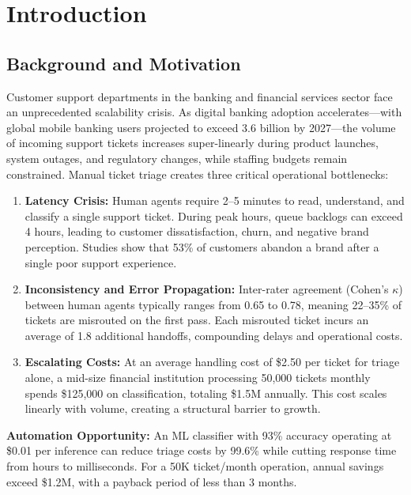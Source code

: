 \documentclass[12pt,a4paper]{article}
\begin{document}
\newpage

\section{Introduction}
\label{sec:introduction}

\subsection{Background and Motivation}
\label{subsec:background}

Customer support departments in the banking and financial services sector face an unprecedented scalability crisis. As digital banking adoption accelerates---with global mobile banking users projected to exceed 3.6 billion by 2027---the volume of incoming support tickets increases super-linearly during product launches, system outages, and regulatory changes, while staffing budgets remain constrained. Manual ticket triage creates three critical operational bottlenecks:

\begin{enumerate}[leftmargin=*]
    \item \textbf{Latency Crisis:} Human agents require 2--5 minutes to read, understand, and classify a single support ticket. During peak hours, queue backlogs can exceed 4 hours, leading to customer dissatisfaction, churn, and negative brand perception. Studies show that 53\% of customers abandon a brand after a single poor support experience.

    \item \textbf{Inconsistency and Error Propagation:} Inter-rater agreement (Cohen's $\kappa$) between human agents typically ranges from 0.65 to 0.78, meaning 22--35\% of tickets are misrouted on the first pass. Each misrouted ticket incurs an average of 1.8 additional handoffs, compounding delays and operational costs.

    \item \textbf{Escalating Costs:} At an average handling cost of \$2.50 per ticket for triage alone, a mid-size financial institution processing 50,000 tickets monthly spends \$125,000 on classification, totaling \$1.5M annually. This cost scales linearly with volume, creating a structural barrier to growth.
\end{enumerate}

\begin{insightbox}
\textbf{Automation Opportunity:} An ML classifier with 93\% accuracy operating at \$0.01 per inference can reduce triage costs by 99.6\% while cutting response time from hours to milliseconds. For a 50K ticket/month operation, annual savings exceed \$1.2M, with a payback period of less than 3 months.
\end{insightbox}
\end{document}
